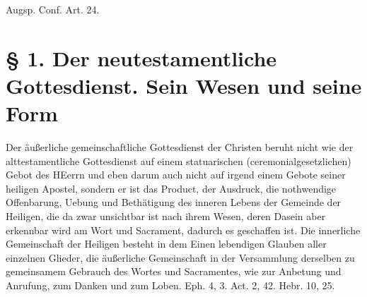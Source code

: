 Augsp. Conf. Art. 24.

\chapter[§ 1. Der neutestamentliche Gottesdienst]{§ 1. Der neutestamentliche Gottesdienst. Sein Wesen und seine Form}


Der äußerliche gemeinschaftliche Gottesdienst der Christen beruht nicht wie der alttestamentliche Gottesdienst auf einem statuarischen (ceremonialgesetzlichen) Gebot des HEerrn und eben darum auch nicht auf irgend einem Gebote seiner heiligen Apostel, sondern er ist das Product, der Ausdruck, die nothwendige Offenbarung, Uebung und Bethätigung des inneren Lebens der Gemeinde der Heiligen, die da zwar unsichtbar ist nach ihrem Wesen, deren Dasein aber erkennbar wird am Wort und Sacrament, dadurch es geschaffen ist. Die innerliche Gemeinschaft der Heiligen besteht in dem Einen lebendigen Glauben aller einzelnen Glieder, die äußerliche Gemeinschaft in der Versammlung derselben zu gemeinsamem Gebrauch des Wortes und Sacramentes, wie zur Anbetung und Anrufung, zum Danken und zum Loben. Eph. 4, 3. Act. 2, 42. Hebr. 10, 25.

